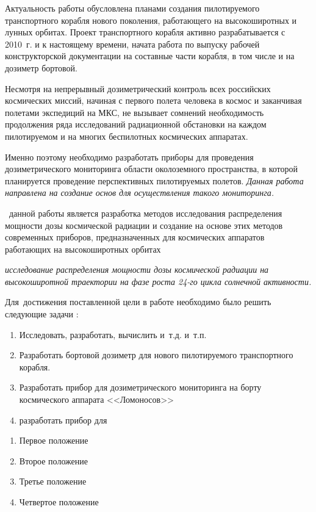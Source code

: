 {\actuality}
 Актуальность работы обусловлена планами создания пилотируемого транспортного корабля нового поколения, работающего на высокоширотных и лунных орбитах. Проект транспортного корабля активно разрабатывается с 2010~г. и к настоящему времени, начата работа по выпуску рабочей конструкторской документации на составные части корабля, в том числе и на дозиметр бортовой.
 
 Несмотря на непрерывный дозиметрический контроль всех российских космических миссий, начиная с первого полета человека в космос и заканчивая полетами экспедиций на МКС, не вызывает сомнений необходимость продолжения ряда исследований радиационной обстановки на каждом пилотируемом и на многих беспилотных космических аппаратах.  
 
  Именно поэтому необходимо разработать приборы  для проведения дозиметрического мониторинга области околоземного пространства, в которой планируется проведение перспективных пилотируемых полетов. \textit{Данная работа направлена на создание основ для осуществления такого мониторинга.}

 \aim\ данной работы является разработка методов исследования распределения мощности дозы космической радиации и создание на основе этих методов современных приборов, предназначенных для космических аппаратов работающих на высокоширотных орбитах
 
 
 \textit{ исследование распределения мощности дозы космической радиации на высокоширотной траектории на фазе роста 24-го цикла солнечной активности.} 

Для~достижения поставленной цели в работе необходимо было решить следующие задачи {\tasks}:
\begin{enumerate}
  \item Исследовать, разработать, вычислить и~т.\:д. и~т.\:п.
  \item Разработать бортовой дозиметр для нового пилотируемого транспортного корабля.
  \item Разработать прибор для дозиметрического мониторинга на борту космического аппарата <<Ломоносов>>
  \item разработать прибор для 
\end{enumerate}

\begin{enumerate}
  \item Первое положение
  \item Второе положение
  \item Третье положение
  \item Четвертое положение
\end{enumerate}

